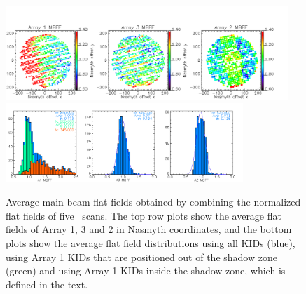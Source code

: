 \begin{figure}[!thbp] 
\begin{center}
  \includegraphics[width=0.95\textwidth]{Figures/Average_main_beam_flat_field_N2R9_10.png}
  \includegraphics[width=0.8\textwidth]{Figures/Histo_average_main_beam_flat_field_N2R9_10.png}
\caption[Average main beam flat fields]{Average main beam flat fields
  obtained by combining the normalized flat fields of five
  \bm\ scans. The top row plots show the average flat fields of Array
  1, 3 and 2 in Nasmyth coordinates, and the bottom plots
  show the average flat field distributions using all KIDs (blue),
  using Array 1 KIDs that are positioned out of the shadow zone
  (green) and using Array 1 KIDs inside the shadow zone, which is
  defined in the text.}
 \label{fig:avg_mbff}
\end{center}
\end{figure}



